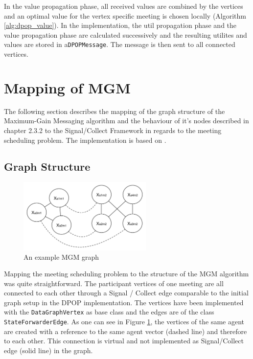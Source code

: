 \vspace{7 mm}
In the value propagation phase, all received values are combined by the vertices and an optimal value for the vertex specific meeting is chosen locally (Algorithm \ref{alg:dpop_value}). In the implementation, the util propagation phase and the value propagation phase are calculated successively and the resulting utilites and values are stored in a\texttt{DPOPMessage}. The message is then sent to all connected vertices.

\section{Mapping of MGM}

The following section describes the mapping of the graph structure of the Maximum-Gain Messaging algorithm and the behaviour of it's nodes described in chapter 2.3.2 to the Signal/Collect Framework in regards to the meeting scheduling problem. The implementation is based on \cite{Chapman2010}.

\subsection{Graph Structure}
\begin{figure}[H]
\includegraphics[width=250px]{graphics/mgm_graph}
\centering
\caption{An example MGM graph}
\label{fig:mgm_graph}
\end{figure}

Mapping the meeting scheduling problem to the structure of the MGM algorithm was quite straightforward. The participant vertices of one meeting are all connected to each other through a Signal / Collect edge comparable to the initial graph setup in the DPOP implementation. The vertices have been implemented with the \texttt{DataGraphVertex} as base class and the edges are of the class \texttt{StateForwarderEdge}. As one can see in Figure \ref{fig:mgm_graph}, the vertices of the same agent are created with a reference to the same agent vector (dashed line) and therefore to each other. This connection is virtual and not implemented as Signal/Collect edge (solid line) in the graph.

